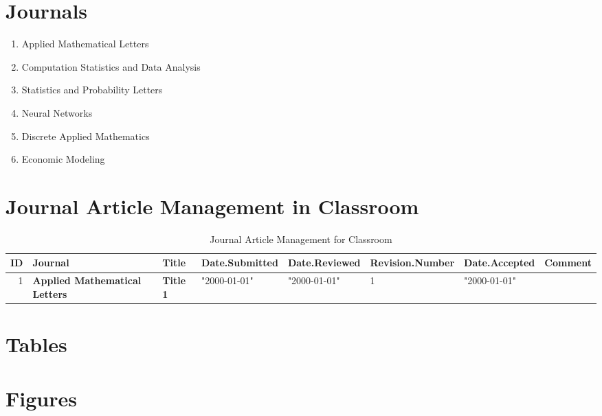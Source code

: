 
\section{Journals}

\begin{enumerate}
\item Applied Mathematical Letters \cite{key1}
\item Computation Statistics and Data Analysis \cite{key2}
\item Statistics and Probability Letters \cite{key3}
\item Neural Networks \cite{key4}
\item Discrete Applied Mathematics \cite{key5}
\item Economic Modeling \cite{key6}
\end{enumerate}

\section{Journal Article Management in Classroom}


\begin{table}[ht]
\caption{Journal Article Management for Classroom}
\begin{tabular}{rlllllll}
\hline
ID & Journal & Title & Date.Submitted & Date.Reviewed & Revision.Number & Date.Accepted & Comment \\
\hline
1 & \textbf{Applied Mathematical Letters} \cite{key1} & \textbf{Title 1} & "2000-01-01" & "2000-01-01" & 1 & "2000-01-01" & \\
\hline
\end{tabular}
\end{table}

\section{Tables}

\section{Figures}

